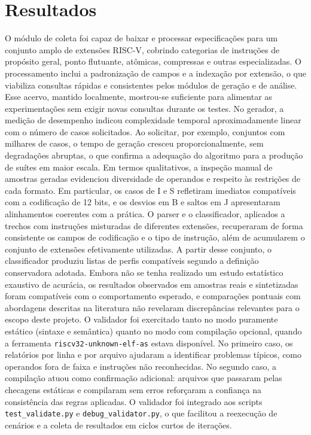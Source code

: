 \documentclass[12pt,a4paper]{article}
\begin{document}
\section{Resultados}
O módulo de coleta foi capaz de baixar e processar especificações para um conjunto amplo de extensões RISC-V, cobrindo categorias de instruções de propósito geral, ponto flutuante, atômicas, compressas e outras especializadas. O processamento inclui a padronização de campos e a indexação por extensão, o que viabiliza consultas rápidas e consistentes pelos módulos de geração e de análise. Esse acervo, mantido localmente, mostrou-se suficiente para alimentar as experimentações sem exigir novas consultas durante os testes.
\newline
\noindent No gerador, a medição de desempenho indicou complexidade temporal aproximadamente linear com o número de casos solicitados. Ao solicitar, por exemplo, conjuntos com milhares de casos, o tempo de geração cresceu proporcionalmente, sem degradações abruptas, o que confirma a adequação do algoritmo para a produção de suítes em maior escala. Em termos qualitativos, a inspeção manual de amostras geradas evidenciou diversidade de operandos e respeito às restrições de cada formato. Em particular, os casos de I e S refletiram imediatos compatíveis com a codificação de 12 bits, e os desvios em B e saltos em J apresentaram alinhamentos coerentes com a prática.
\newline
\noindent O parser e o classificador, aplicados a trechos com instruções misturadas de diferentes extensões, recuperaram de forma consistente os campos de codificação e o tipo de instrução, além de acumularem o conjunto de extensões efetivamente utilizadas. A partir desse conjunto, o classificador produziu listas de perfis compatíveis segundo a definição conservadora adotada. Embora não se tenha realizado um estudo estatístico exaustivo de acurácia, os resultados observados em amostras reais e sintetizadas foram compatíveis com o comportamento esperado, e comparações pontuais com abordagens descritas na literatura \cite{herdt2020,armstrong2019} não revelaram discrepâncias relevantes para o escopo deste projeto.
\newline
\noindent O validador foi exercitado tanto no modo puramente estático (sintaxe e semântica) quanto no modo com compilação opcional, quando a ferramenta \texttt{riscv32-unknown-elf-as} estava disponível. No primeiro caso, os relatórios por linha e por arquivo ajudaram a identificar problemas típicos, como operandos fora de faixa e instruções não reconhecidas. No segundo caso, a compilação atuou como confirmação adicional: arquivos que passaram pelas checagens estáticas e compilaram sem erros reforçaram a confiança na consistência das regras aplicadas. O validador foi integrado aos scripts \texttt{test\_validate.py} e \texttt{debug\_validator.py}, o que facilitou a reexecução de cenários e a coleta de resultados em ciclos curtos de iterações.
\end{document}
